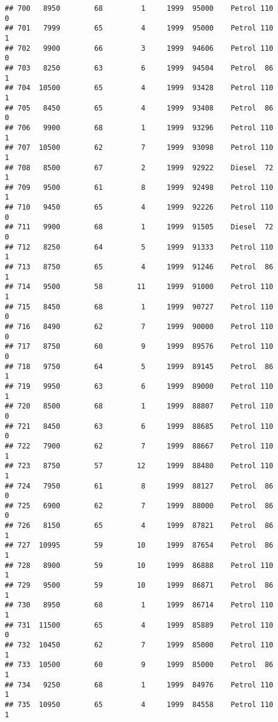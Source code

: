 \documentclass[]{article}
\begin{document}
\begin{verbatim}
## 700   8950        68         1     1999  95000    Petrol 110         0
## 701   7999        65         4     1999  95000    Petrol 110         1
## 702   9900        66         3     1999  94606    Petrol 110         0
## 703   8250        63         6     1999  94504    Petrol  86         1
## 704  10500        65         4     1999  93428    Petrol 110         1
## 705   8450        65         4     1999  93408    Petrol  86         0
## 706   9900        68         1     1999  93296    Petrol 110         1
## 707  10500        62         7     1999  93098    Petrol 110         1
## 708   8500        67         2     1999  92922    Diesel  72         1
## 709   9500        61         8     1999  92498    Petrol 110         1
## 710   9450        65         4     1999  92226    Petrol 110         0
## 711   9900        68         1     1999  91505    Diesel  72         0
## 712   8250        64         5     1999  91333    Petrol 110         1
## 713   8750        65         4     1999  91246    Petrol  86         1
## 714   9500        58        11     1999  91000    Petrol 110         1
## 715   8450        68         1     1999  90727    Petrol 110         0
## 716   8490        62         7     1999  90000    Petrol 110         0
## 717   8750        60         9     1999  89576    Petrol 110         0
## 718   9750        64         5     1999  89145    Petrol  86         1
## 719   9950        63         6     1999  89000    Petrol 110         1
## 720   8500        68         1     1999  88807    Petrol 110         0
## 721   8450        63         6     1999  88685    Petrol 110         0
## 722   7900        62         7     1999  88667    Petrol 110         1
## 723   8750        57        12     1999  88480    Petrol 110         1
## 724   7950        61         8     1999  88127    Petrol  86         0
## 725   6900        62         7     1999  88000    Petrol  86         0
## 726   8150        65         4     1999  87821    Petrol  86         1
## 727  10995        59        10     1999  87654    Petrol  86         1
## 728   8900        59        10     1999  86888    Petrol 110         1
## 729   9500        59        10     1999  86871    Petrol  86         1
## 730   8950        68         1     1999  86714    Petrol 110         1
## 731  11500        65         4     1999  85889    Petrol 110         0
## 732  10450        62         7     1999  85000    Petrol 110         1
## 733  10500        60         9     1999  85000    Petrol  86         1
## 734   9250        68         1     1999  84976    Petrol 110         1
## 735  10950        65         4     1999  84558    Petrol 110         1

\end{verbatim}
\end{document}
